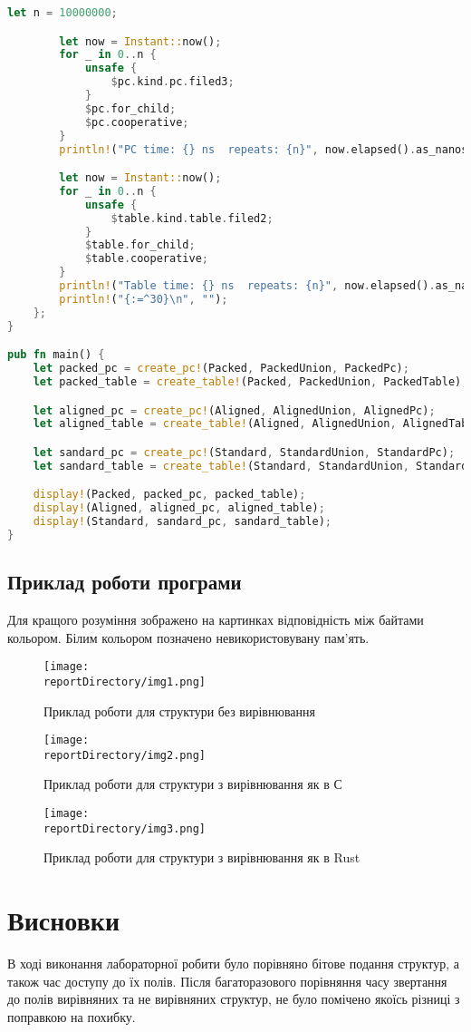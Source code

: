 \begin{lstlisting}[language=Rust, style=colouredRust]
        let n = 10000000;

        let now = Instant::now();
        for _ in 0..n {
            unsafe {
                $pc.kind.pc.filed3;
            }
            $pc.for_child;
            $pc.cooperative;
        }
        println!("PC time: {} ns  repeats: {n}", now.elapsed().as_nanos().to_string());

        let now = Instant::now();
        for _ in 0..n {
            unsafe {
                $table.kind.table.filed2;
            }
            $table.for_child;
            $table.cooperative;
        }
        println!("Table time: {} ns  repeats: {n}", now.elapsed().as_nanos().to_string());
        println!("{:=^30}\n", "");
    };
}

pub fn main() {
    let packed_pc = create_pc!(Packed, PackedUnion, PackedPc);
    let packed_table = create_table!(Packed, PackedUnion, PackedTable);

    let aligned_pc = create_pc!(Aligned, AlignedUnion, AlignedPc);
    let aligned_table = create_table!(Aligned, AlignedUnion, AlignedTable);

    let sandard_pc = create_pc!(Standard, StandardUnion, StandardPc);
    let sandard_table = create_table!(Standard, StandardUnion, StandardTable);

    display!(Packed, packed_pc, packed_table);
    display!(Aligned, aligned_pc, aligned_table);
    display!(Standard, sandard_pc, sandard_table);
}
\end{lstlisting}


\newpage
\subsection{Приклад роботи програми}
Для кращого розуміння зображено на картинках відповідність між байтами кольором.
Білим кольором позначено невикористовувану пам'ять.
\begin{figure}[h!]
    \centering
    \texttt{[image: \\reportDirectory/img1.png]}
    \caption{Приклад роботи для структури без вирівнювання}
    \label{fig:task}
\end{figure}
\begin{figure}[h!]
    \centering
    \texttt{[image: \\reportDirectory/img2.png]}
    \caption{Приклад роботи для структури з вирівнювання як в С}
    \label{fig:task}
\end{figure}
\begin{figure}[h!]
    \centering
    \texttt{[image: \\reportDirectory/img3.png]}
    \caption{Приклад роботи для структури з вирівнювання як в Rust}
    \label{fig:task}
\end{figure}


\newpage
\section{Висновки}
В ході виконання лабораторної робити було порівняно бітове подання структур,
а також час доступу до їх полів. Після багаторазового порівняння часу звертання до полів вирівняних та не вирівняних структур,
не було помічено якоїсь різниці з поправкою на похибку.

